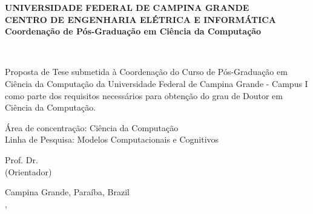 \begin{center}
\textbf{UNIVERSIDADE FEDERAL DE CAMPINA GRANDE} \\
\textbf{CENTRO DE ENGENHARIA ELÉTRICA E INFORMÁTICA} \\
\textbf{Coordenação de Pós-Graduação em Ciência da Computação}
\vspace{3em}

\Large{}
\thetitle
\vspace{3em}

\Large{\theauthor}\\
\vspace{3em}

\normalsize
\begin{flushright}
\parbox[t]{122mm}{Proposta de Tese submetida à Coordenação do Curso de Pós-Graduação em Ciência da Computação da Universidade Federal de Campina Grande - Campus I como parte dos requisitos necessários para obtenção do grau de Doutor em Ciência da Computação.}
\end{flushright}
\vspace{3em}

\begin{flushleft}
Área de concentração: Ciência da Computação\\
Linha de Pesquisa: Modelos Computacionais e Cognitivos
\vspace{3em}
\end{flushleft}

Prof. Dr. \profa\\
(Orientador) \\
\vfill

Campina Grande, Paraíba, Brazil \\
\MONTH, \the\year
\end{center}
